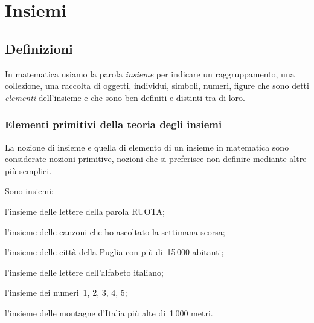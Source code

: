 


\newcommand{\eseminter}[4]{%
  \emph{
  \makebox[.30\textwidth][l]{a parole} 
  \makebox[.20\textwidth][c]{con i predicati} 
  \makebox[.20\textwidth][c]{con le parentesi} 
  \makebox[.20\textwidth][c]{sulla retta} \\[-.5em]}
  \hrule 

  \parbox[l]{.30\textwidth}{#1}
  \makebox[.20\textwidth][c]{#2}
  \makebox[.20\textwidth][c]{#3}
  \parbox[c]{.20\textwidth}{#4}
}

\chapter{Insiemi}

\section{Definizioni}
\label{sec:insiemi_definizioni}

In matematica usiamo la parola \textit{insieme} per indicare un
raggruppamento, una collezione, una raccolta di oggetti, individui,
simboli, numeri, figure che sono detti \textit{elementi}
dell'insieme e che sono ben definiti e distinti tra di
loro.

\subsection{Elementi primitivi della teoria degli insiemi}
\label{subsec:el_prim}

La nozione di insieme e quella di elemento di un insieme in matematica
sono considerate nozioni primitive, nozioni che si preferisce non
definire mediante altre più semplici.

 \begin{esempio}
 Sono insiemi:
 \begin{enumeratea}
  \item l'insieme delle lettere della parola RUOTA;
  \item l'insieme delle canzoni che ho ascoltato la settimana scorsa;
  \item l'insieme delle città della Puglia con più di~15\,000 abitanti;
  \item l'insieme delle lettere dell'alfabeto italiano;
  \item l'insieme dei numeri~1, 2, 3, 4, 5;
  \item l'insieme delle montagne d'Italia più alte di~1\,000 metri.
 \end{enumeratea}
 \end{esempio}

